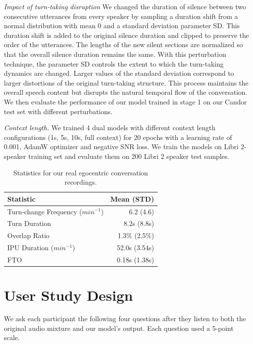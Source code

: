 \noindent\textit{Impact of turn-taking disruption} {We changed the duration of silence between two consecutive utterances from every speaker by sampling a duration shift from a normal distribution with mean 0 and a standard deviation parameter SD. This duration shift is added to the original silence duration and clipped  to preserve the order of the utterances. The lengths of the new silent sections are normalized so that the overall silence duration remains the same. With this perturbation technique, the parameter SD controls the extent to which the turn-taking dynamics are changed. Larger values of the standard deviation correspond to larger distortions of the original turn-taking structure. This process maintains the overall speech content but disrupts the natural temporal flow of the conversation. We then evaluate the performance of our model trained in stage 1 on our Candor test set with different  perturbations.
}

\noindent\textit{Context length.}  {We trained 4 dual models with different context length configurations (1s, 5s, 10s, full context) for 20 epochs with a learning rate of 0.001, AdamW optimizer and negative SNR loss. We train the models on Libri 2-speaker training set and evaluate them on 200 Libri 2 speaker test samples.}



\begin{table}[t!]
\caption{Statistics for our real egocentric conversation recordings. }
\vskip -0.1in
\centering
{\footnotesize
\begin{tabular}{lr}
\toprule
 Statistic &  Mean (STD)\\
\midrule
Turn-change Frequency ($min^{-1}$) & 6.2 (4.6)  \\
Turn Duration &  8.2s (8.8s)    \\
Overlap Ratio &  1.3\% (2.5\%)    \\
IPU Duration ($min^{-1}$) & 52.0s (3.54s) \\
FTO & 0.18s (1.38s)  \\
\bottomrule
\end{tabular}
}
\label{tab:realworldstats}
\vskip -0.15in
\end{table}

\section{{User Study Design}}\label{sec:user_study}
{We ask each participant the following four questions after they listen to both the original audio mixture and our model's output. Each question used a 5-point scale.}

